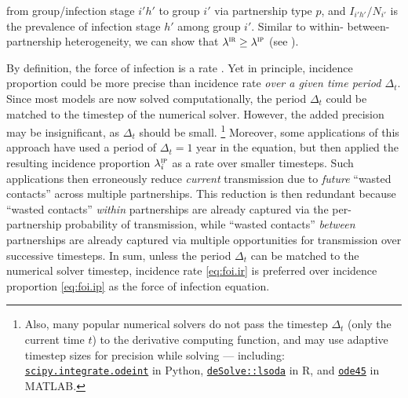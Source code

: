 from group/infection stage $i'h'$ to group $i'$ via partnership type $p$,
and $I_{i'h'}/N_{i'}$ is the prevalence of infection stage $h'$ among group $i'$.
Similar to within- \vs between-partnership heterogeneity,
we can show that $\lambda^\textsc{ir} \ge \lambda^\textsc{ip}$ (see ).
\par
By definition, the force of infection is a rate \cite{Anderson1991}.
Yet in principle, incidence proportion could be more precise than incidence rate
\emph{over a given time period $\Delta_t$}.
Since most models are now solved computationally,
the period $\Delta_t$ could be matched to the timestep of the numerical solver.
However, the added precision may be insignificant, as $\Delta_t$ should be small.%
\footnote{\label{foot:ode}%
  Also, many popular numerical solvers do not pass the timestep $\Delta_t$
  (only the current time $t$) to the derivative computing function,
  and may use adaptive timestep sizes for precision while solving --- including:
  \href{https://docs.scipy.org/doc/scipy/reference/generated/scipy.integrate.odeint.html}
  {\texttt{scipy.integrate.odeint}} in Python,
  \href{https://cran.r-project.org/web/packages/deSolve/index.html}
  {\texttt{deSolve::lsoda}} in R, and
  \href{https://www.mathworks.com/help/matlab/ref/ode45.html}
  {\texttt{ode45}} in MATLAB.}
Moreover, some applications of this approach have used
a period of $\Delta_t = 1$ year in the equation, but then
applied the resulting incidence proportion $\lambda_i^\textsc{ip}$ as a rate over smaller timesteps.
Such applications then erroneously reduce \emph{current} transmission
due to \emph{future} ``wasted contacts'' across multiple partnerships.
This reduction is then redundant because
``wasted contacts'' \emph{within} partnerships are already captured via
the per-partnership probability of transmission, while
``wasted contacts'' \emph{between} partnerships are already captured via
multiple opportunities for transmission over successive timesteps.
In sum, unless the period $\Delta_t$ can be matched to the numerical solver timestep,
incidence rate \eqref{eq:foi.ir} is preferred over incidence proportion \eqref{eq:foi.ip}
as the force of infection equation.

